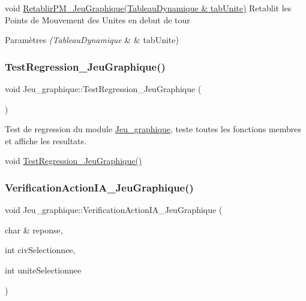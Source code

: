 void \hyperlink{classJeu__graphique_a780cecdb8248b4e5612895b026a61a5a}{Retablir\+P\+M\+\_\+\+Jeu\+Graphique(\+Tableau\+Dynamique \& tab\+Unite)} Retablit les Points de Mouvement des Unites en debut de tour 


\begin{DoxyParams}{Paramètres}
{\em (\+Tableau\+Dynamique} & \& tab\+Unite) \\
\hline
\end{DoxyParams}
\mbox{\label{classJeu__graphique_abc9707aea80c14dee891b4249c602c9c}} 
\subsubsection{\texorpdfstring{Test\+Regression\+\_\+\+Jeu\+Graphique()}{TestRegression\_JeuGraphique()}}
{\footnotesize\ttfamily void Jeu\+\_\+graphique\+::\+Test\+Regression\+\_\+\+Jeu\+Graphique (\begin{DoxyParamCaption}{ }\end{DoxyParamCaption})}



Test de regression du module \hyperlink{classJeu__graphique}{Jeu\+\_\+graphique}, teste toutes les fonctions membres et affiche les resultats. 

void \hyperlink{classJeu__graphique_abc9707aea80c14dee891b4249c602c9c}{Test\+Regression\+\_\+\+Jeu\+Graphique()} \mbox{\label{classJeu__graphique_ac5ea38ecd12b46fee29ba7967a1b1a55}} 
\subsubsection{\texorpdfstring{Verification\+Action\+I\+A\+\_\+\+Jeu\+Graphique()}{VerificationActionIA\_JeuGraphique()}}
{\footnotesize\ttfamily void Jeu\+\_\+graphique\+::\+Verification\+Action\+I\+A\+\_\+\+Jeu\+Graphique (\begin{DoxyParamCaption}\item[{char \&}]{reponse,  }\item[{int}]{civ\+Selectionnee,  }\item[{int}]{unite\+Selectionnee }\end{DoxyParamCaption})}



